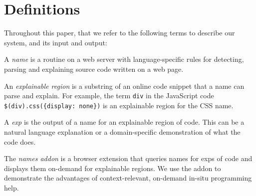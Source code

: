 \section{Definitions}

Throughout this paper, that we refer to the following terms to describe our system, and its input and output:

A \emph{\gls{name}} is a routine on a web server with language-specific rules for detecting, parsing and explaining source code written on a web page.

An \emph{explainable region} is a substring of an online code snippet that a \gls{name} can parse and explain.  For example, the term \texttt{div} in the JavaScript code \texttt{\$(\qs{}div\qs{}).css(\{\qs{}display\qs{}: \qs{}none\qs{}\})} is an explainable region for the CSS \gls{name}.

A \emph{\gls{exp}} is the output of a \gls{name} for an explainable region of code. This can be a natural language explanation or a domain-specific demonstration of what the code does.


The \emph{\Glspl{name} addon} is a browser extension that queries \glspl{name} for \glspl{exp} of code and displays them on-demand for explainable regions.  We use the addon to demonstrate the advantages of context-relevant, on-demand in-situ programming help.
